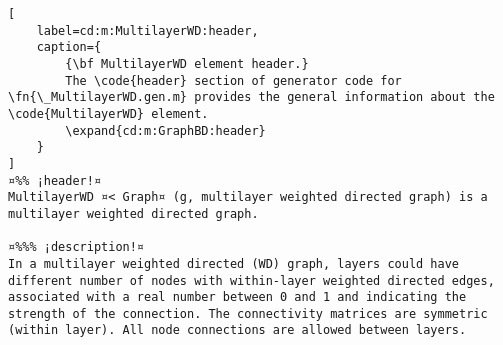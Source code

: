 \documentclass{tufte-handout}
\begin{document}
\begin{lstlisting}[
	label=cd:m:MultilayerWD:header,
	caption={
		{\bf MultilayerWD element header.}
		The \code{header} section of generator code for \fn{\_MultilayerWD.gen.m} provides the general information about the \code{MultilayerWD} element.
		\expand{cd:m:GraphBD:header}
	}
]
¤%% ¡header!¤
MultilayerWD ¤< Graph¤ (g, multilayer weighted directed graph) is a multilayer weighted directed graph.

¤%%% ¡description!¤
In a multilayer weighted directed (WD) graph, layers could have different number of nodes with within-layer weighted directed edges, associated with a real number between 0 and 1 and indicating the strength of the connection. The connectivity matrices are symmetric (within layer). All node connections are allowed between layers.
\end{lstlisting}
\end{document}
